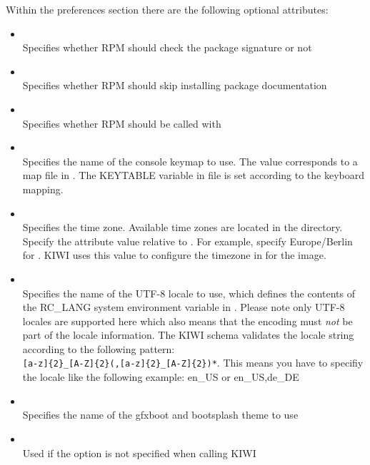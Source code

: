 Within the preferences section there are the following optional
attributes:

\begin{itemize}
\item {}\\
      Specifies whether RPM should check the package signature or not
\item {}\\
      Specifies whether RPM should skip installing package documentation
\item {}\\
      Specifies whether RPM should be called with 
\item {}\\
      Specifies the name of the console keymap to use. The value corresponds
      to a map file in . The KEYTABLE variable in
       file is set according to the keyboard
      mapping.
\item {}\\
      Specifies the time zone. Available time zones are located in the
       directory. Specify the attribute value relative to
      . For example, specify Europe/Berlin for
      . KIWI uses this value to configure
      the timezone in  for the image.
\item {}\\
      Specifies the name of the UTF-8 locale to use, which defines the
      contents of the RC\_LANG system environment variable in
      . Please note only UTF-8 locales are supported
      here which also means that the encoding must \emph{not} be part of
      the locale information. The KIWI schema validates the locale string
      according to the following pattern:\\
      \verb+[a-z]{2}_[A-Z]{2}(,[a-z]{2}_[A-Z]{2})*+.
      This means you have to specifiy the locale like the following example:
      en\_US or en\_US,de\_DE
\item {}\\
      Specifies the name of the gfxboot and bootsplash theme to use
\item {}\\
      Used if the  option is not specified when calling KIWI

\end{itemize}
